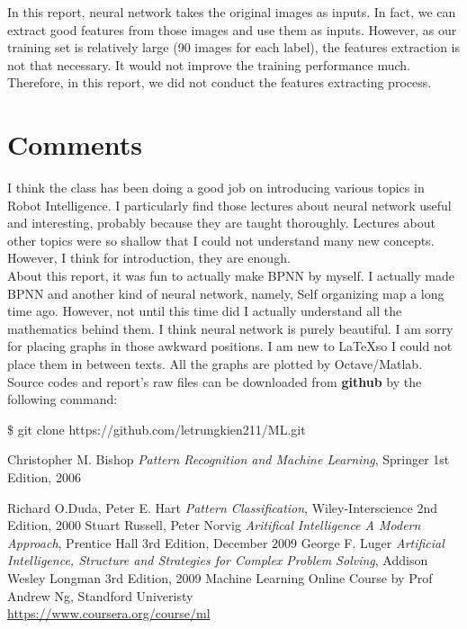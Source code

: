 \documentclass[a4paper, 11pt]{article}
\begin{document}
In this report, neural network takes the original images as inputs. In fact, we can extract good features from those images and use them as inputs. However, as our training set is relatively large (90 images for each label), the features extraction is not that necessary. It would not improve the training performance much. Therefore, in this report, we did not conduct the features extracting process.

\section{Comments}
I think the class has been doing a good job on introducing various topics in Robot Intelligence. I particularly find those lectures about neural network useful and interesting, probably because they are taught thoroughly. Lectures about other topics were so shallow that I could not understand many new concepts. However, I think for introduction, they are enough.\\
About this report, it was fun to actually make BPNN by myself. I actually made BPNN and another kind of neural network, namely, Self organizing map a long time ago. However, not until this time did I actually understand all the mathematics behind them. I think neural network is purely beautiful. I am sorry for placing graphs in those awkward positions. I am new to \LaTeX so I could not place them in between texts. All the graphs are plotted by Octave/Matlab. \\
Source codes and report's raw files can be downloaded from \textbf{github} by the following command:
\begin{center} \$ git clone https://github.com/letrungkien211/ML.git \end{center}
\begin{thebibliography}{9}
  \label{itm:PRML}
  Christopher M. Bishop
  \emph{Pattern Recognition and Machine Learning},
  Springer
  1st Edition,
  2006

  \label{itm:PC}
  Richard O.Duda, Peter E. Hart
  \emph{Pattern Classification},
  Wiley-Interscience
  2nd Edition,
  2000
  \label{itm:AIMA}
  Stuart Russell, Peter Norvig
  \emph{  Aritifical Intelligence A Modern Approach},
  Prentice Hall
  3rd Edition,
  December 2009
  \label{itm:SSCPS}
  George F. Luger
  \emph{Artificial Intelligence, Structure and Strategies for Complex Problem Solving},
  Addison Wesley Longman
  3rd Edition,
  2009
  \label{itm:ML}
  Machine Learning Online Course by Prof Andrew Ng, Standford Univeristy \\
  \url{https://www.coursera.org/course/ml}
  
\end{thebibliography}
\end{document}
